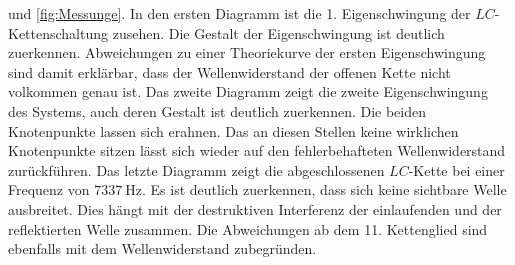 und \ref{fig:Messunge}. In den ersten Diagramm ist die 1. Eigenschwingung der
$LC$-Kettenschaltung zusehen. Die Gestalt der Eigenschwingung ist deutlich
zuerkennen. Abweichungen zu einer Theoriekurve der ersten Eigenschwingung
sind damit erklärbar, dass der Wellenwiderstand der offenen Kette nicht
volkommen genau ist.
Das zweite Diagramm zeigt die zweite Eigenschwingung des Systems, auch deren
Gestalt ist deutlich zuerkennen. Die beiden Knotenpunkte lassen sich erahnen.
Das an diesen Stellen keine wirklichen Knotenpunkte sitzen lässt sich wieder auf
den fehlerbehafteten Wellenwiderstand zurückführen.
Das letzte Diagramm zeigt die abgeschlossenen $LC$-Kette bei einer Frequenz
von $\SI{7337}{\hertz}$. Es ist deutlich zuerkennen, dass sich keine sichtbare
Welle ausbreitet. Dies hängt mit der destruktiven Interferenz der
einlaufenden und der reflektierten Welle zusammen. Die Abweichungen ab dem 11.
Kettenglied sind ebenfalls mit dem Wellenwiderstand zubegründen.




